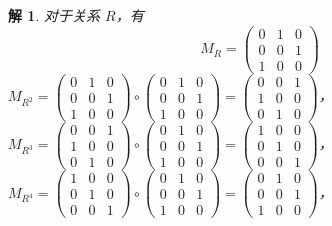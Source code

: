 \documentclass[normal,cyan]{elegantnote}
\newtheorem{solve}{解}
\begin{document}
\begin{solve}
    对于关系 $R$，有 $$M_{R}=\left(\begin{array}{lll}
        0 & 1 & 0 \\
        0 & 0 & 1 \\
        1 & 0 & 0
        \end{array}\right)$$
        $M_{R^{2}}=\left(\begin{array}{lll}
            0 & 1 & 0 \\
            0 & 0 & 1 \\
            1 & 0 & 0
            \end{array}\right) \circ\left(\begin{array}{lll}
            0 & 1 & 0 \\
            0 & 0 & 1 \\
            1 & 0 & 0
            \end{array}\right)=\left(\begin{array}{lll}
            0 & 0 & 1 \\
            1 & 0 & 0 \\
            0 & 1 & 0
            \end{array}\right)$，\\
        $M_{R^{3}}=\left(\begin{array}{lll}
            0 & 0 & 1 \\
            1 & 0 & 0 \\
            0 & 1 & 0
            \end{array}\right) \circ\left(\begin{array}{lll}
            0 & 1 & 0 \\
            0 & 0 & 1 \\
            1 & 0 & 0
            \end{array}\right)=\left(\begin{array}{lll}
            1 & 0 & 0 \\
            0 & 1 & 0 \\
            0 & 0 & 1
            \end{array}\right)$，\\
        $M_{R^{4}}=\left(\begin{array}{lll}
            1 & 0 & 0 \\
            0 & 1 & 0 \\
            0 & 0 & 1
            \end{array}\right) \circ\left(\begin{array}{lll}
            0 & 1 & 0 \\
            0 & 0 & 1 \\
            1 & 0 & 0
            \end{array}\right)=\left(\begin{array}{lll}
            0 & 1 & 0 \\
            0 & 0 & 1 \\
            1 & 0 & 0
            \end{array}\right)$，


\end{solve}
\end{document}
